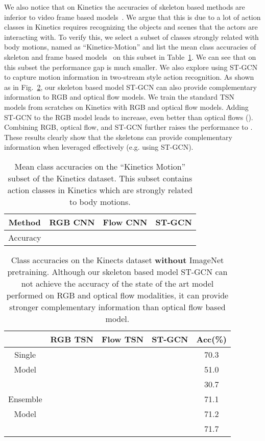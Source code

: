 \documentclass[letterpaper]{article} \usepackage{aaai18}  \usepackage{times}  \usepackage{helvet}  \usepackage{courier}  \usepackage{url}  \usepackage{graphicx}
\begin{document}
We also notice that on Kinetics the accuracies of skeleton based methods are inferior to video frame based models~\cite{Kay2017Kinetics}. 
We argue that this is due to a lot of action classes in Kinetics requires recognizing the objects and scenes that the actors are interacting with. 
To verify this, we select a subset of  classes strongly related with body motions, named as ``Kinetics-Motion'' and list the mean class accuracies of skeleton and frame based models~\cite{Kay2017Kinetics} on this subset in Table~\ref{tab:kinetics_motion}. 
We can see that on this subset the performance gap is much smaller. 
We also explore using ST-GCN to capture motion information in two-stream style action recognition. 
As shown as in Fig.~\ref{tab:kinetics_ensemble}, our skeleton based model ST-GCN can also provide complementary information to RGB and optical flow models. 
We train the standard TSN~\cite{TSN2016ECCV} models from scratches on Kinetics with RGB and optical flow models. Adding ST-GCN to the RGB model leads to  increase, even better than optical flows ().  Combining RGB, optical flow, and ST-GCN further raises the performance to . 
These results clearly show that the skeletons can provide complementary information when leveraged effectively (e.g. using ST-GCN).


\begin{table}
	\centering
	\begin{tabular}{c|c|c|c}\hline
		Method & RGB CNN & Flow CNN & ST-GCN \\ \hline
		Accuracy &  &  &  \\ \hline
	\end{tabular}
	\caption{Mean class accuracies on the ``Kinetics Motion'' subset of the Kinetics dataset. This subset contains 
	 action classes in Kinetics which are strongly related to body motions.}\label{tab:kinetics_motion}
\end{table}

\begin{table}
	\small
	\centering
	\begin{tabular}{c|ccc|c}
		  &RGB TSN   &   Flow TSN &   ST-GCN   &Acc(\%) \\
		\hline
		\hline
		 Single&\checkmark &            &            & 70.3\\ 
		 Model&           & \checkmark &            & 51.0\\ 
		 &           &            & \checkmark & 30.7\\ \hline
		 Ensemble&\checkmark &\checkmark  &            & 71.1\\
		 Model&\checkmark &            & \checkmark & 71.2\\ 
		 &\checkmark &\checkmark  & \checkmark & 71.7\\ 


	\end{tabular}
	\caption{Class accuracies on the Kinects dataset \textbf{without} ImageNet pretraining. Although our skeleton based model ST-GCN can not achieve the accuracy of the state of the art model performed on RGB and optical flow modalities, it can provide stronger complementary information than optical flow based model.}\label{tab:kinetics_ensemble}
\end{table}
\end{document}

